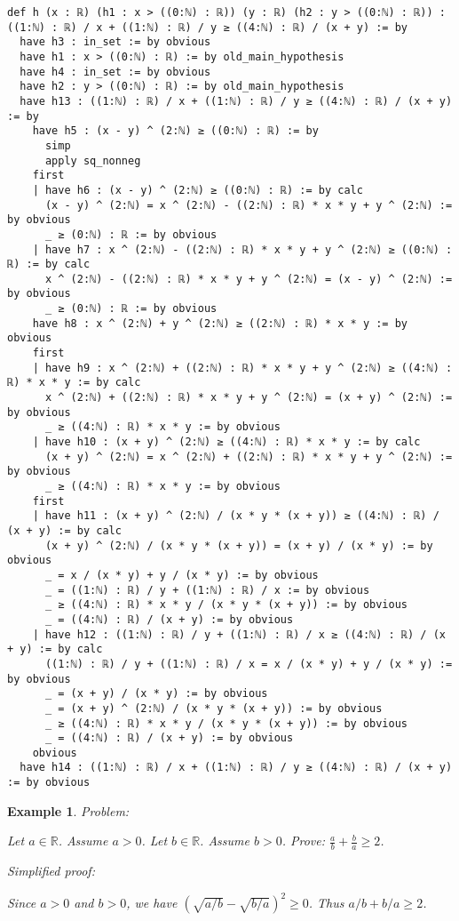 \documentclass{article}
\newtheorem{example}{Example}
\begin{document}
\begin{tcolorbox}[colback=white!10, width=\linewidth]
\begin{lstlisting}[language=Lean4]
def h (x : ℝ) (h1 : x > ((0:ℕ) : ℝ)) (y : ℝ) (h2 : y > ((0:ℕ) : ℝ)) : ((1:ℕ) : ℝ) / x + ((1:ℕ) : ℝ) / y ≥ ((4:ℕ) : ℝ) / (x + y) := by
  have h3 : in_set := by obvious
  have h1 : x > ((0:ℕ) : ℝ) := by old_main_hypothesis
  have h4 : in_set := by obvious
  have h2 : y > ((0:ℕ) : ℝ) := by old_main_hypothesis
  have h13 : ((1:ℕ) : ℝ) / x + ((1:ℕ) : ℝ) / y ≥ ((4:ℕ) : ℝ) / (x + y) := by
    have h5 : (x - y) ^ (2:ℕ) ≥ ((0:ℕ) : ℝ) := by
      simp
      apply sq_nonneg
    first
    | have h6 : (x - y) ^ (2:ℕ) ≥ ((0:ℕ) : ℝ) := by calc
      (x - y) ^ (2:ℕ) = x ^ (2:ℕ) - ((2:ℕ) : ℝ) * x * y + y ^ (2:ℕ) := by obvious
      _ ≥ (0:ℕ) : ℝ := by obvious
    | have h7 : x ^ (2:ℕ) - ((2:ℕ) : ℝ) * x * y + y ^ (2:ℕ) ≥ ((0:ℕ) : ℝ) := by calc
      x ^ (2:ℕ) - ((2:ℕ) : ℝ) * x * y + y ^ (2:ℕ) = (x - y) ^ (2:ℕ) := by obvious
      _ ≥ (0:ℕ) : ℝ := by obvious
    have h8 : x ^ (2:ℕ) + y ^ (2:ℕ) ≥ ((2:ℕ) : ℝ) * x * y := by obvious
    first
    | have h9 : x ^ (2:ℕ) + ((2:ℕ) : ℝ) * x * y + y ^ (2:ℕ) ≥ ((4:ℕ) : ℝ) * x * y := by calc
      x ^ (2:ℕ) + ((2:ℕ) : ℝ) * x * y + y ^ (2:ℕ) = (x + y) ^ (2:ℕ) := by obvious
      _ ≥ ((4:ℕ) : ℝ) * x * y := by obvious
    | have h10 : (x + y) ^ (2:ℕ) ≥ ((4:ℕ) : ℝ) * x * y := by calc
      (x + y) ^ (2:ℕ) = x ^ (2:ℕ) + ((2:ℕ) : ℝ) * x * y + y ^ (2:ℕ) := by obvious
      _ ≥ ((4:ℕ) : ℝ) * x * y := by obvious
    first
    | have h11 : (x + y) ^ (2:ℕ) / (x * y * (x + y)) ≥ ((4:ℕ) : ℝ) / (x + y) := by calc
      (x + y) ^ (2:ℕ) / (x * y * (x + y)) = (x + y) / (x * y) := by obvious
      _ = x / (x * y) + y / (x * y) := by obvious
      _ = ((1:ℕ) : ℝ) / y + ((1:ℕ) : ℝ) / x := by obvious
      _ ≥ ((4:ℕ) : ℝ) * x * y / (x * y * (x + y)) := by obvious
      _ = ((4:ℕ) : ℝ) / (x + y) := by obvious
    | have h12 : ((1:ℕ) : ℝ) / y + ((1:ℕ) : ℝ) / x ≥ ((4:ℕ) : ℝ) / (x + y) := by calc
      ((1:ℕ) : ℝ) / y + ((1:ℕ) : ℝ) / x = x / (x * y) + y / (x * y) := by obvious
      _ = (x + y) / (x * y) := by obvious
      _ = (x + y) ^ (2:ℕ) / (x * y * (x + y)) := by obvious
      _ ≥ ((4:ℕ) : ℝ) * x * y / (x * y * (x + y)) := by obvious
      _ = ((4:ℕ) : ℝ) / (x + y) := by obvious
    obvious
  have h14 : ((1:ℕ) : ℝ) / x + ((1:ℕ) : ℝ) / y ≥ ((4:ℕ) : ℝ) / (x + y) := by obvious

\end{lstlisting}
\end{tcolorbox}


\begin{example}
Problem:
\begin{tcolorbox}[colback=yellow!10, width=\linewidth]
Let $a\in\mathbb{R}$. Assume $a > 0$.
    Let $b\in\mathbb{R}$. Assume $b > 0$.
    Prove: $\frac{a}{b} + \frac{b}{a} \ge 2$.
\end{tcolorbox}

Simplified proof:
\begin{tcolorbox}[colback=blue!10, width=\linewidth]
Since $a>0$ and $b>0$, we have $(\sqrt{a/b} - \sqrt{b/a})^2 \ge 0$. Thus $a/b + b/a \ge 2$.
\end{tcolorbox}
\end{example}
\end{document}
